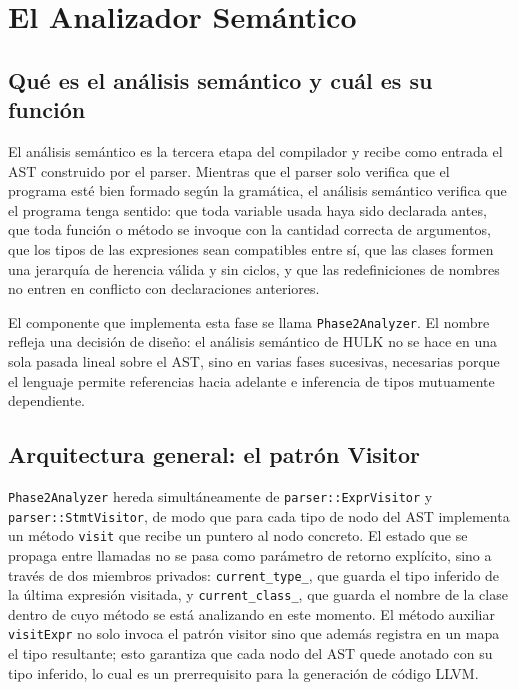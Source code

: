 \documentclass[11pt,a4paper]{article}
\begin{document}
\section{El Analizador Semántico}

\subsection{Qué es el análisis semántico y cuál es su función}

El análisis semántico es la tercera etapa del compilador y recibe como entrada el AST construido por el parser. Mientras que el parser solo verifica que el programa esté bien formado según la gramática, el análisis semántico verifica que el programa tenga sentido: que toda variable usada haya sido declarada antes, que toda función o método se invoque con la cantidad correcta de argumentos, que los tipos de las expresiones sean compatibles entre sí, que las clases formen una jerarquía de herencia válida y sin ciclos, y que las redefiniciones de nombres no entren en conflicto con declaraciones anteriores.

El componente que implementa esta fase se llama \texttt{Phase2Analyzer}. El nombre refleja una decisión de diseño: el análisis semántico de HULK no se hace en una sola pasada lineal sobre el AST, sino en varias fases sucesivas, necesarias porque el lenguaje permite referencias hacia adelante e inferencia de tipos mutuamente dependiente.

\subsection{Arquitectura general: el patrón Visitor}

\texttt{Phase2Analyzer} hereda simultáneamente de \texttt{parser::ExprVisitor} y \texttt{parser::StmtVisitor}, de modo que para cada tipo de nodo del AST implementa un método \texttt{visit} que recibe un puntero al nodo concreto. El estado que se propaga entre llamadas no se pasa como parámetro de retorno explícito, sino a través de dos miembros privados: \texttt{current\_type\_}, que guarda el tipo inferido de la última expresión visitada, y \texttt{current\_class\_}, que guarda el nombre de la clase dentro de cuyo método se está analizando en este momento. El método auxiliar \texttt{visitExpr} no solo invoca el patrón visitor sino que además registra en un mapa el tipo resultante; esto garantiza que cada nodo del AST quede anotado con su tipo inferido, lo cual es un prerrequisito para la generación de código LLVM.
\end{document}
